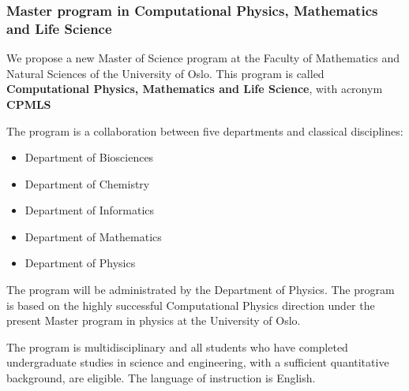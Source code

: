 \documentclass{beamer}
\begin{document}
\begin{frame}
\frametitle{Master program in Computational Physics, Mathematics and Life Science}

\begin{block}{}
We propose a new Master of Science program at the Faculty of Mathematics and Natural Sciences of the University of Oslo. This program is called  \textbf{Computational Physics, Mathematics and Life Science}, with acronym  \textbf{CPMLS} 


The program is a collaboration between five departments and classical disciplines:

\begin{itemize}
 \item Department of Biosciences

 \item Department of Chemistry

 \item Department of Informatics

 \item Department of Mathematics

 \item Department of Physics
\end{itemize}

\noindent
The program will be administrated by the Department of Physics. 
The program is based on the highly successful Computational Physics direction under the present Master program
in physics at the University of Oslo.

The program is multidisciplinary and all students who have completed
undergraduate studies in science and engineering, with a sufficient
quantitative background, are eligible.  The language of instruction is
English.  


\end{block}
\end{frame}
\end{document}
